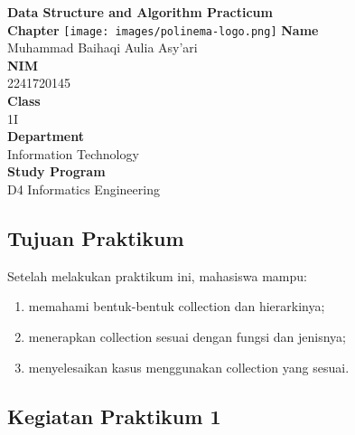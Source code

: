 \documentclass[12pt,titlepage]{article}
\newcommand{\vSubject}{Data Structure and Algorithm Practicum}
\newcommand{\vSubtitle}{Chapter}
\newcommand{\vName}{Muhammad Baihaqi Aulia Asy'ari}
\newcommand{\vNIM}{2241720145}
\newcommand{\vClass}{1I}
\newcommand{\vDepartment}{Information Technology}
\newcommand{\vStudyProgram}{D4 Informatics Engineering}
\begin{document}
\begin{titlepage}
    \centering
    \vfill
    {\bfseries\LARGE
        \vSubject\\
        \vskip0.25cm
        \vSubtitle
    }
    \vfill
    \texttt{[image: images/polinema-logo.png]}
    \vfill
    {
        \textbf{Name}\\
        \vName\\
        \vskip0.5cm
        \textbf{NIM}\\
        \vNIM\\
        \vskip0.5cm
        \textbf{Class}\\
        \vClass\\
        \vskip0.5cm
        \textbf{Department}\\
        \vDepartment\\
        \vskip0.5cm
        \textbf{Study Program}\\
        \vStudyProgram
    }
\end{titlepage}

\newpage

\setcounter{section}{16}
\subsection{Tujuan Praktikum}
Setelah melakukan praktikum ini, mahasiswa mampu:
\begin{enumerate}
    \item memahami bentuk-bentuk collection dan hierarkinya;
    \item menerapkan collection sesuai dengan fungsi dan jenisnya;
    \item menyelesaikan kasus menggunakan collection yang sesuai.
\end{enumerate}

\subsection{Kegiatan Praktikum 1}
\end{document}
